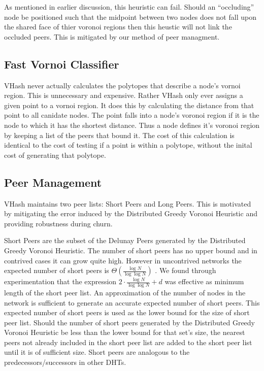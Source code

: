 \documentclass{IEEEtran}
\begin{document}
As mentioned in earlier discussion, this heuristic can fail. Should an ``occluding'' node be positioned such that the midpoint between two nodes does not fall upon the shared face of thier voronoi regions then this heustic will not link the occluded peers. %
This is mitigated by our method of peer managment.

\subsection{Fast Vornoi Classifier}
VHash never actually calculates the polytopes that describe a node's vornoi region.
This is unnecessary and expensive.
Rather VHash only ever assigns a given point to a vornoi region.
It does this by calculating the distance from that point to all canidate nodes.
The point falls into a node's voronoi region if it is the node to which it has the shortest distance.
Thus a node defines it's voronoi region by keeping a list of the peers that bound it.
The cost of this calculation is identical to the cost of testing if a point is within a polytope, without the inital cost of generating that polytope.

\subsection{Peer Management}
VHash maintains two peer lists: Short Peers and Long Peers.
This is motivated by mitigating the error induced by the Distributed Greedy Voronoi Heuristic and providing robustness during churn.

Short Peers are the subset of the Delunay Peers generated by the Distributed Greedy Voronoi Heuristic. 
The number of short peers has no upper bound and in contrived cases it can grow quite high. However in uncontrived networks the expected number of short peers is $\Theta(\frac{\log N}{\log \log N} )$ \cite{bern1991expected}. 
We found through experimentation that the expression $2 \cdot \frac{\log N}{\log \log N} + d$ was effective as  minimum length of the short peer list.
An approximation of the number of nodes in the network is sufficient to generate an accurate expected number of short peers.  
This expected number of short peers is used as the lower bound for the size of short peer list.
Should the number of short peers generated by the Distributed Greedy Voronoi Heuristic be less than the lower bound for that set's size, the nearest peers not already included in the short peer list are added to the short peer list until it is of sufficient size.
Short peers are analogous to the predecessors/successors in other DHTs.
\end{document}

